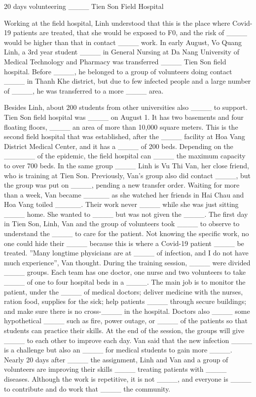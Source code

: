 \documentclass[a4paper]{article}
\begin{document}
20 days volunteering ____ Tien Son Field Hospital

Working at the field hospital, Linh understood that this is the place where Covid-19 patients are treated, that she would be exposed to F0, and the risk of ____ would be higher than that in contact ____ work. 
In early August, Vo Quang Linh, a 3rd year student ____ in General Nursing at Da Nang University of Medical Technology and Pharmacy was transferred ____ Tien Son field hospital. 
Before ____, he belonged to a group of volunteers doing contact ____ in Thanh Khe district, but due to few infected people and a large number of ____, he was transferred to a more ____ area.

Besides Linh, about 200 students from other universities also ____ to support.
Tien Son field hospital was ____ on August 1. 
It has two basements and four floating floors, ____ an area of more than 10,000 square meters. 
This is the second field hospital that was established, after the ____ facility at Hoa Vang District Medical Center, and it has a ____ of 200 beds. 
Depending on the ______ of the epidemic, the field hospital can ____ the maximum capacity to over 700 beds.
In the same group ____ Linh is Vu Thi Van, her close friend, who is training at Tien Son. 
Previously, Van's group also did contact ____, but the group was put on ____, pending a new transfer order.
Waiting for more than a week, Van became _____ as she watched her friends in Hai Chau and Hoa Vang toiled _____. Their work never ____ while she was just sitting ____ home.
She wanted to ____ but was not given the ____.
The first day in Tien Son, Linh, Van and the group of volunteers took ____ to observe to understand the ____ to care for the patient.
Not knowing the specific work, no one could hide their ____ because this is where a Covid-19 patient ____ be treated.
”Many longtime physicians are at ____ of infection, and I do not have much experience”, Van thought. 
During the training session, ____  were divided ____ groups.
 Each team has one doctor, one nurse and two volunteers to take ____ of one to four hospital beds in a ____. 
The main job is to monitor the patient, under the ____ of medical doctors; deliver medicine with the nurses, ration food, supplies for the sick; help patients ____ through secure buildings; and make sure there is no cross-____ in the hospital. 
Doctors also ____ some hypothetical ____ such as fire, power outage, or ____ of the patients so that students can practice their skills. 
At the end of the session, the groups will give ____ to each other to improve each day. 
Van said that the new infection ____ is a challenge but also an ____ for medical students to gain more ____.
Nearly 20 days after ____ the assignment, Linh and Van and a group of volunteers are improving their skills ____ treating patients with ____ diseases.
Although the work is repetitive, it is not ____, and everyone is ____ to contribute and do work that ____ the community. 
\end{document}
